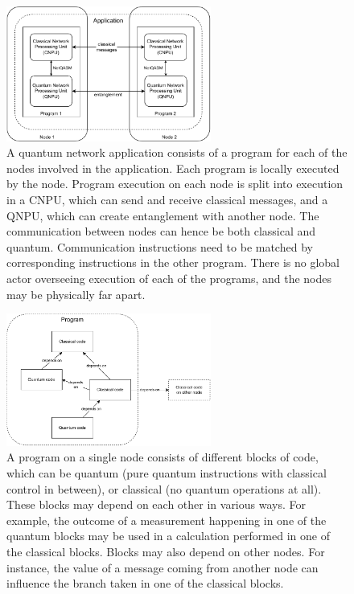\begin{figure}[t]
    \centering
    \includegraphics[width=0.6\textwidth]{figures/netqasm/multi_program_app_2.pdf}
    \caption{ A quantum network application consists of a program for each of the nodes involved in the application.
        Each program is locally executed by the node.
        Program execution on each node is split into execution in a \acf{CNPU}, which can send and receive classical messages, and a \acf{QNPU}, which can create entanglement with another node.
        The communication between nodes can hence be both classical and quantum.
        Communication instructions need to be matched by corresponding instructions in the other program.
        There is no global actor overseeing execution of each of the programs, and the nodes may be physically far apart.}
    \label{netqasm:fig:app_programs}
\end{figure}

\begin{figure}[t]
    \centering
    \includegraphics[width=0.6\textwidth]{figures/netqasm/program_decomp.pdf}
    \caption{A program on a single node consists of different blocks of code, which can be quantum (pure quantum instructions with classical control in between), or classical (no quantum operations at all).
        These blocks may depend on each other in various ways.
        For example, the outcome of a measurement happening in one of the quantum blocks may be used in a calculation performed in one of the classical blocks.
        Blocks may also depend on other nodes.
        For instance, the value of a message coming from another node can influence the branch taken in one of the classical blocks.}
    \label{netqasm:fig:program_decomp}
\end{figure}


